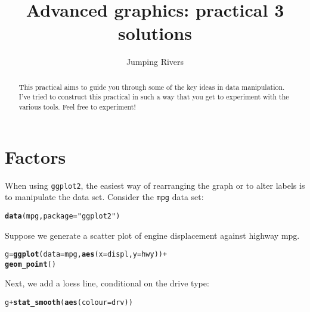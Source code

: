 \documentclass[a4paper,justified,openany]{tufte-handout}\usepackage[]{graphicx}\usepackage[]{color}
\title{Advanced graphics: practical 3 solutions}
\author[Jumping Rivers]{Jumping Rivers}
\date{}  %
\makeatletter
\newcommand{\hlstr}[1]{\textcolor[rgb]{0.2,0.2,0.2}{#1}}%
\newcommand{\hlopt}[1]{\textcolor[rgb]{0.102,0.102,0.102}{#1}}%
\newcommand{\hlstd}[1]{\textcolor[rgb]{0.102,0.102,0.102}{#1}}%
\newcommand{\hlkwb}[1]{\textcolor[rgb]{0.102,0.102,0.102}{#1}}%
\newcommand{\hlkwc}[1]{\textcolor[rgb]{0.2,0.2,0.2}{#1}}%
\newcommand{\hlkwd}[1]{\textcolor[rgb]{0.102,0.102,0.102}{\textbf{#1}}}%
\newenvironment{kframe}{%
 \def\at@end@of@kframe{}%
 \ifinner\ifhmode%
  \def\at@end@of@kframe{\end{minipage}}%
  \begin{minipage}{\columnwidth}%
 \fi\fi%
 \def\FrameCommand##1{\hskip\@totalleftmargin \hskip-\fboxsep
 \colorbox{shadecolor}{##1}\hskip-\fboxsep
     \hskip-\linewidth \hskip-\@totalleftmargin \hskip\columnwidth}%
 \MakeFramed {\advance\hsize-\width
   \@totalleftmargin\z@ \linewidth\hsize
   \@setminipage}}%
 {\par\unskip\endMakeFramed%
 \at@end@of@kframe}
\newenvironment{knitrout}{}{} %
\newcommand{\cc}{\texttt}
\makeatother
\begin{document}
\maketitle%

\begin{abstract}
  \noindent This practical aims to guide you through some of the key ideas in
  data manipulation. I've tried to construct this practical in such a way that
  you get to experiment with the various tools. Feel free to experiment!
\end{abstract}


\section{Factors}

When using \cc{ggplot2}, the easiest way of rearranging the graph or to alter labels
is to manipulate the data set. Consider the \cc{mpg} data set:

\begin{knitrout}
\color{fgcolor}\begin{kframe}
\begin{alltt}
\hlkwd{data}\hlstd{(mpg,} \hlkwc{package} \hlstd{=} \hlstr{"ggplot2"}\hlstd{)}
\end{alltt}
\end{kframe}
\end{knitrout}

Suppose we generate a scatter plot of engine displacement against highway mpg.

\begin{knitrout}
\color{fgcolor}\begin{kframe}
\begin{alltt}
\hlstd{g} \hlkwb{=} \hlkwd{ggplot}\hlstd{(}\hlkwc{data}\hlstd{=mpg,} \hlkwd{aes}\hlstd{(}\hlkwc{x}\hlstd{=displ,} \hlkwc{y}\hlstd{=hwy))} \hlopt{+}
  \hlkwd{geom_point}\hlstd{()}
\end{alltt}
\end{kframe}
\end{knitrout}

\noindent Next, we add a loess line, conditional on the drive type:

\begin{knitrout}
\color{fgcolor}\begin{kframe}
\begin{alltt}
\hlstd{g} \hlopt{+} \hlkwd{stat_smooth}\hlstd{(}\hlkwd{aes}\hlstd{(}\hlkwc{colour}\hlstd{=drv))}
\end{alltt}
\end{kframe}
\end{knitrout}
\end{document}
